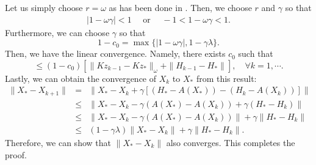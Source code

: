 Let us simply choose $r = \omega$ as has been done in \cite{mishchenko2022proxskip}. Then, we choose $r$ and $\gamma$ so that 
\begin{eqnarray*}
|1 - \omega \gamma| < 1 \quad \mbox{ or } \quad -1 < 1 - \omega \gamma < 1.  
\end{eqnarray*}
Furthermore, we can choose $\gamma$ so that 
\begin{equation}
1 - c_0 = \max \{ |1 - \omega \gamma|, 1 - \gamma \lambda \}. 
\end{equation}
Then, we have the linear convergence. Namely, there exists $c_0$ such that 
\begin{equation}
[\|Kz_k - Kz_*\|_\omega + \|H_k - H_*\|] \leq (1 - c_0) [ \|Kz_{k-1} - Kz_*\|_\omega + \|H_{k-1} - H_*\| ], \quad \forall k = 1,\cdots. 
\end{equation}
Lastly, we can obtain the convergence of $X_k$ to $X_*$ from this result: 
\begin{eqnarray*}
\|X_{*} - X_{k+1}\| &=& \|X_* - X_k + \gamma [(H_* - A(X_*)) - (H_k - A(X_k))] \| \\
&\leq& \|X_* - X_k - \gamma (A(X_*) - A(X_k)) + \gamma (H_* - H_k) \| \\ 
&\leq& \|X_* - X_k - \gamma (A(X_*) - A(X_k))\| + \gamma \|H_* - H_k\| \\
&\leq& (1 - \gamma \lambda) \|X_* - X_k\| + \gamma \|H_* - H_k\|.
\end{eqnarray*}
Therefore, we can show that $\|X_* - X_{k}\|$ also converges.  This completes the proof. 

